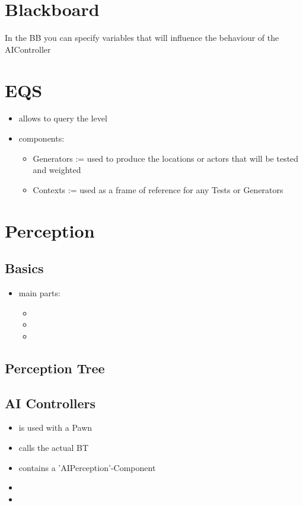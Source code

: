     \section{Blackboard}
        In the BB you can specify variables that will influence the behaviour of the AIController

    \section{EQS}%
        \begin{itemize}
            \item allows to query the level
            \item components:
            \begin{itemize}
                \item Generators := used to produce the locations or actors that will be tested and weighted
                \item Contexts := used as a frame of reference for any Tests or Generators
            \end{itemize}
        \end{itemize}

    \section{Perception}
        \subsection{Basics}
            \begin{itemize}
                \item main parts:
                \begin{itemize}
                    \item {}
                    \item {}
                    \item \code{}
                \end{itemize}
            \end{itemize}
        \subsection{Perception Tree}%
        \subsection{AI Controllers}%
            \begin{itemize}
                \item is used with a Pawn
                \item calls the actual BT
                \item contains a 'AIPerception'-Component
                \item 
                \item 
            \end{itemize}
        
